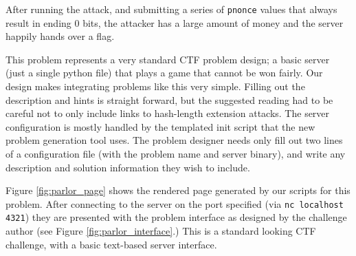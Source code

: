 After running the attack, and submitting a series of \texttt{pnonce}
values that always result in ending 0 bits, the attacker has a large
amount of money and the server happily hands over a flag.

This problem represents a very standard CTF problem design; a basic
server (just a single python file) that plays a game that cannot be
won fairly. Our design makes integrating problems like this very
simple. Filling out the description and hints is straight forward,
but the suggested reading had to be careful not to only include
links to hash-length extension attacks. The server configuration is
mostly handled by the templated init script that the new problem
generation tool uses. The problem designer needs only fill out two
lines of a configuration file (with the problem name and server
binary), and write any description and solution information they wish
to include.

Figure \ref{fig:parlor_page} shows the rendered page generated by our
scripts for this problem. After connecting to the server on the port
specified (via \texttt{nc localhost 4321}) they are presented with the
problem interface as designed by the challenge author (see Figure
\ref{fig:parlor_interface}.) This is a standard looking CTF challenge,
with a basic text-based server interface.
